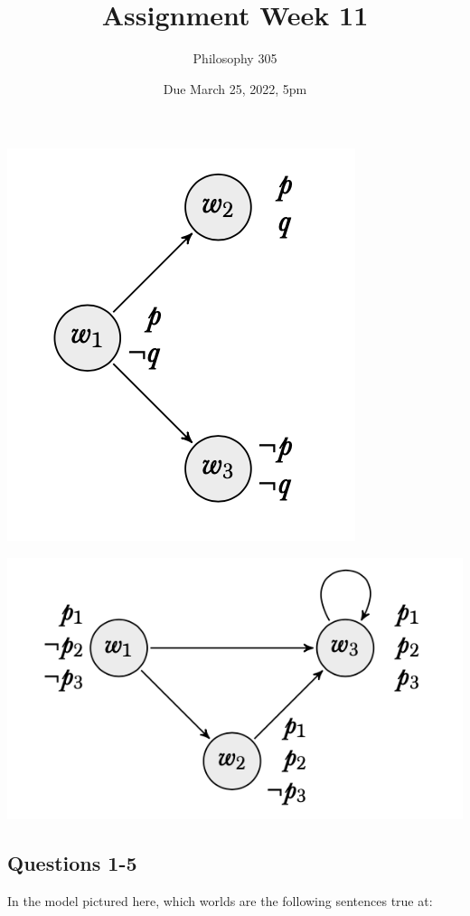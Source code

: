\documentclass[
  11pt,
  twocolumn]{article}
\title{Assignment Week 11}
\author{Philosophy 305}
\date{Due March 25, 2022, 5pm}
\begin{document}
\maketitle

\includegraphics{11_first_picture.png}

\includegraphics{11_second_picture.png}

\newpage

\hypertarget{questions-1-5}{%
\subsection{Questions 1-5}\label{questions-1-5}}

In the model pictured here, which worlds are the following sentences
true at:
\end{document}
